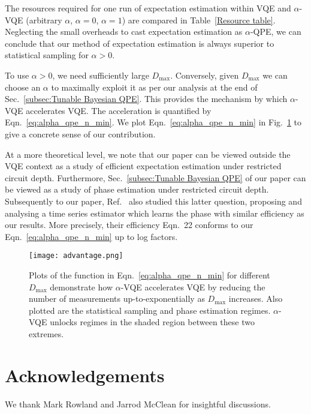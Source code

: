 \documentclass[twocolumn,
 reprint,
 amsmath,amssymb,
 aps,
 floatfix,
superscriptaddress
]{revtex4-1}
\begin{document}
The resources required for one run of expectation estimation within VQE and $\alpha$-VQE (arbitrary $\alpha$,
$\alpha=0$, $\alpha=1$) are compared in Table~\ref{Resource table}.
Neglecting the small overheads to cast expectation estimation as $\alpha$-QPE, we can conclude that our method of expectation estimation is always superior to statistical sampling for $\alpha>0$.

To use $\alpha>0$, we need sufficiently large $D_\text{max}$. Conversely, given $D_\text{max}$ we can choose an $\alpha$ to maximally exploit it as per our analysis at the end of Sec.~\ref{subsec:Tunable Bayesian QPE}. This provides the mechanism by which $\alpha$-VQE accelerates VQE. The acceleration is quantified by Eqn.~\ref{eq:alpha_qpe_n_min}. We plot Eqn.~\ref{eq:alpha_qpe_n_min} in Fig.~\ref{applicability} to give a concrete sense of our contribution. 

At a more theoretical level, we note that our paper can be viewed outside the VQE context as a study of efficient expectation estimation under restricted circuit depth. Furthermore, Sec.~\ref{subsec:Tunable Bayesian QPE} of our paper can be viewed as a study of phase estimation under restricted circuit depth. Subsequently to our paper, Ref.~\cite{Terhal2018} also studied this latter question, proposing and analysing a time series estimator which learns the phase with similar efficiency as our results. More precisely, their efficiency Eqn.~22 conforms to our Eqn.~\ref{eq:alpha_qpe_n_min} up to log factors.

\begin{figure}[H]
\texttt{[image: advantage.png]}
\centering{}
\caption{{\scriptsize{} Plots of the function in Eqn.~\ref{eq:alpha_qpe_n_min} for different $D_\text{max}$ demonstrate how $\alpha$-VQE accelerates VQE by reducing the number of measurements up-to-exponentially as $D_\text{max}$ increases. Also plotted are the statistical sampling and phase estimation regimes. $\alpha$-VQE unlocks regimes in the shaded region between these two extremes.}}
\label{applicability}
\end{figure}

\section{\label{sec: Acknowledgements} Acknowledgements}
We thank Mark Rowland and Jarrod McClean for insightful discussions.
\end{document}
